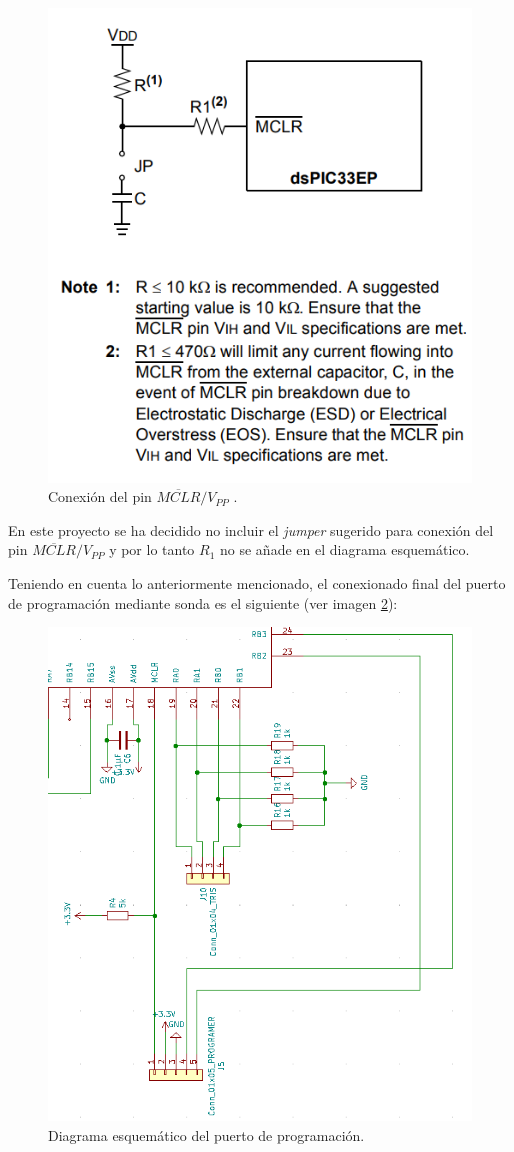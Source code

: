 \begin{itemize}
    \begin{figure}[H]
    \centering 
    \includegraphics[width=.6\linewidth]{pictures/MCLR.PNG}
    \caption{Conexión del pin $\overline{MCLR}/V_{PP}$ \cite{DsPIC33EP512GM60416BitMicrocontrollers}.}
    \label{fig:MCL_Conexionado}
    \end{figure}
    
    En este proyecto se ha decidido no incluir el \textit{jumper} sugerido para conexión del pin $\overline{MCLR}/V_{PP}$ y por lo tanto $R_1$ no se añade en el diagrama esquemático.
    
    Teniendo en cuenta lo anteriormente mencionado, el conexionado final del puerto de programación mediante sonda es el siguiente (ver imagen \ref{fig:Sonda_Esquematico}):
    
    \begin{figure}[H]
    \centering 
    \includegraphics[width=.5\linewidth]{pictures/sonda.PNG}
    \caption{Diagrama esquemático del puerto de programación.}
    \label{fig:Sonda_Esquematico}
    \end{figure}
    

\end{itemize}
